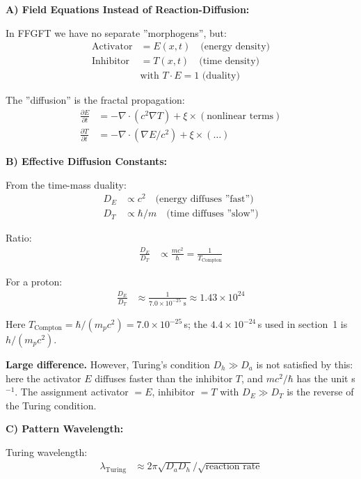 	\textbf{A) Field Equations Instead of Reaction-Diffusion:}
	
	In FFGFT we have no separate ''morphogens'', but:
	\begin{align*}
		\text{Activator} &= E(x,t) \quad \text{(energy density)} \\
		\text{Inhibitor} &= T(x,t) \quad \text{(time density)} \\
		&\text{with } T \cdot E = 1 \text{ (duality)}
	\end{align*}
	
	The ''diffusion'' is the fractal propagation:
	\begin{align*}
		\frac{\partial E}{\partial t} &= -\nabla \cdot (c^2 \nabla T) + \xi \times (\text{nonlinear terms}) \\
		\frac{\partial T}{\partial t} &= -\nabla \cdot (\nabla E/c^2) + \xi \times (\dots)
	\end{align*}
	
	\textbf{B) Effective Diffusion Constants:}
	
	From the time-mass duality:
	\begin{align*}
		D_E &\propto c^2 \quad \text{(energy diffuses ''fast'')} \\
		D_T &\propto \hbar/m \quad \text{(time diffuses ''slow'')}
	\end{align*}
	
	Ratio:
	\begin{align*}
		\frac{D_E}{D_T} &\propto \frac{m c^2}{\hbar} = \frac{1}{T_{\text{Compton}}}
	\end{align*}
	
	For a proton:
	\begin{align*}
		\frac{D_E}{D_T} &\approx \frac{1}{7.0 \times 10^{-25} \text{ s}} \approx 1.43 \times 10^{24}
	\end{align*}
	
	Here $T_{\text{Compton}} = \hbar/(m_p c^2) = 7.0\times10^{-25}$\,s; the $4.4\times10^{-24}$\,s used in section~1 is $h/(m_p c^2)$.
	
	\textbf{Large difference.} However, Turing's condition $D_h \gg D_a$ is not satisfied by this: here the activator $E$ diffuses faster than the inhibitor $T$, and $mc^2/\hbar$ has the unit s$^{-1}$. The assignment activator $=E$, inhibitor $=T$ with $D_E \gg D_T$ is the reverse of the Turing condition.
	
	\textbf{C) Pattern Wavelength:}
	
	Turing wavelength:
	\begin{align*}
		\lambda_{\text{Turing}} &\approx 2\pi \sqrt{D_a D_h} / \sqrt{\text{reaction rate}}
	\end{align*}
	
